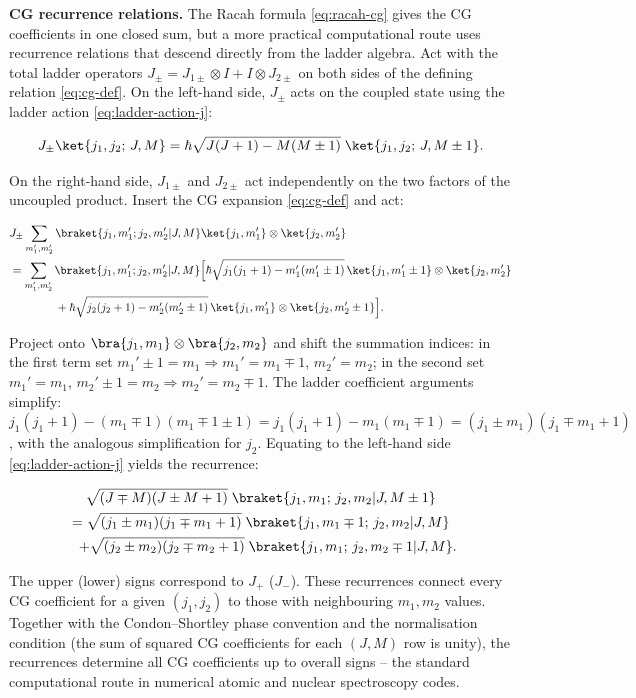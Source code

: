 \medskip\noindent\textbf{CG recurrence relations.}
The Racah formula \eqref{eq:racah-cg} gives the CG coefficients in one closed sum, but a more practical computational route uses recurrence relations that descend directly from the ladder algebra. Act with the total ladder operators $J_\pm = J_{1\pm} \otimes I + I \otimes J_{2\pm}$ on both sides of the defining relation \eqref{eq:cg-def}. On the left-hand side, $J_\pm$ acts on the coupled state using the ladder action \eqref{eq:ladder-action-j}:
\begin{linenomath}
  \begin{equation*}
    J_\pm\ket{j_1,j_2;\,J,M}
    = \hbar\sqrt{J(J+1)-M(M\pm1)}\;\ket{j_1,j_2;\,J,M\pm1}.
  \end{equation*}
\end{linenomath}
On the right-hand side, $J_{1\pm}$ and $J_{2\pm}$ act independently on the two factors of the uncoupled product. Insert the CG expansion \eqref{eq:cg-def} and act:
\begin{linenomath}
\begin{align*}
&J_\pm\sum_{m_1',m_2'}\braket{j_1,m_1';j_2,m_2'|J,M}\ket{j_1,m_1'}\otimes\ket{j_2,m_2'}\\
&= \sum_{m_1',m_2'}\braket{j_1,m_1';j_2,m_2'|J,M}
\Bigl[\hbar\sqrt{j_1(j_1+1)-m_1'(m_1'\pm1)}\,\ket{j_1,m_1'\pm1}\otimes\ket{j_2,m_2'}\\
&\qquad\qquad + \hbar\sqrt{j_2(j_2+1)-m_2'(m_2'\pm1)}\,\ket{j_1,m_1'}\otimes\ket{j_2,m_2'\pm1}\Bigr].
\end{align*}
\end{linenomath}
Project onto $\bra{j_1,m_1}\otimes\bra{j_2,m_2}$ and shift the summation indices: in the first term set $m_1'\pm1=m_1\Rightarrow m_1'=m_1\mp1$, $m_2'=m_2$; in the second set $m_1'=m_1$, $m_2'\pm1=m_2\Rightarrow m_2'=m_2\mp1$. The ladder coefficient arguments simplify: $j_1(j_1+1)-(m_1\mp1)(m_1\mp1\pm1)=j_1(j_1+1)-m_1(m_1\mp1)=(j_1\pm m_1)(j_1\mp m_1+1)$, with the analogous simplification for $j_2$. Equating to the left-hand side \eqref{eq:ladder-action-j} yields the recurrence:
\begin{linenomath}
  \begin{multline}
    \sqrt{(J\mp M)(J\pm M+1)}\;
      \braket{j_1,m_1;\,j_2,m_2|J,M\pm1} \\
    = \sqrt{(j_1\pm m_1)(j_1\mp m_1+1)}\;
      \braket{j_1,m_1\mp1;\,j_2,m_2|J,M} \\
    \quad + \sqrt{(j_2\pm m_2)(j_2\mp m_2+1)}\;
      \braket{j_1,m_1;\,j_2,m_2\mp1|J,M}.
    \label{eq:cg-recurrence}
  \end{multline}
\end{linenomath}
The upper (lower) signs correspond to $J_+$ ($J_-$). These recurrences connect every CG coefficient for a given $(j_1,j_2)$ to those with neighbouring $m_1,m_2$ values. Together with the Condon--Shortley phase convention and the normalisation condition (the sum of squared CG coefficients for each $(J,M)$ row is unity), the recurrences determine all CG coefficients up to overall signs -- the standard computational route in numerical atomic and nuclear spectroscopy codes.

